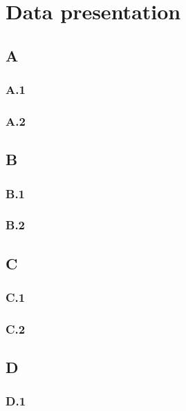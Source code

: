 
\chapter{Data presentation}
\label{chap:data}
\ifpdf
    \graphicspath{{Chapter3/Figs/Raster/}{Chapter3/Figs/PDF/}{Chapter3/Figs/}}
\else
    \graphicspath{{Chapter3/Figs/Vector/}{Chapter3/Figs/}}
\fi

\section{A}
\subsection{A.1} 
\subsection{A.2} 
\section{B}
\subsection{B.1} 
\subsection{B.2} 
\section{C}
\subsection{C.1} 
\subsection{C.2} 
\section{D}
\subsection{D.1} 

